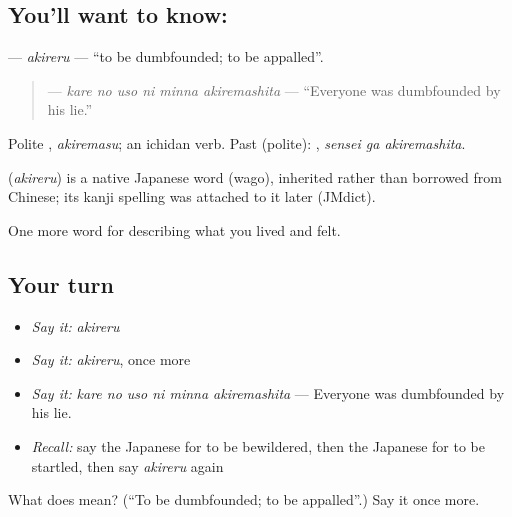 \subsection*{You'll want to know: }
\textbf{} — \emph{akireru} — \textquotedblleft{}to be dumbfounded; to be appalled\textquotedblright{}.

\begin{quote}
\textbf{   } — \emph{kare no uso ni minna akiremashita} — \textquotedblleft{}Everyone was dumbfounded by his lie.\textquotedblright{}
\end{quote}

Polite \textbf{}, \emph{akiremasu}; an ichidan verb. Past (polite): \textbf{ }, \emph{sensei ga akiremashita}.

\begin{cousinweb}
\textbf{} (\emph{akireru}) is a native Japanese word (wago), inherited rather than borrowed from Chinese; its kanji spelling was attached to it later (JMdict).
\end{cousinweb}

\begin{grammarlens}[title={What you've built}]
One more word for describing what you lived and felt.
\end{grammarlens}

\subsection*{Your turn}
\begin{itemize}
\raggedright
  \item \emph{Say it:} \emph{akireru}
  \item \emph{Say it:} \emph{akireru}, once more
  \item \emph{Say it:} \emph{kare no uso ni minna akiremashita} — Everyone was dumbfounded by his lie.
  \item \emph{Recall:} say the Japanese for to be bewildered, then the Japanese for to be startled, then say \emph{akireru} again
\end{itemize}

\begin{tcolorbox}[breakable,colback=teal!4,colframe=teal!35!black,title={Before you move on}]
What does  mean? (\textquotedblleft{}To be dumbfounded; to be appalled\textquotedblright{}.) Say it once more.
\end{tcolorbox}
